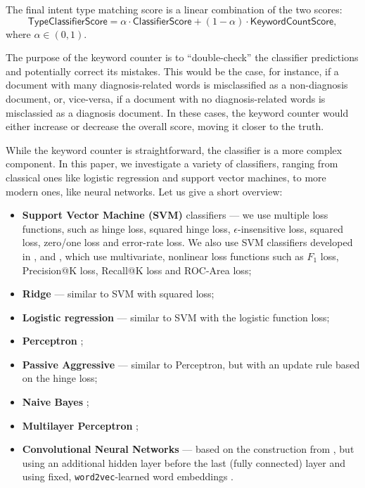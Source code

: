 The final intent type matching score is a linear combination of the two scores:
\begin{equation}\label{clf-combine-formula}
 \textsf{TypeClassifierScore} = \alpha\cdot\textsf{ClassifierScore} + (1-\alpha)\cdot\textsf{KeywordCountScore},
\end{equation}
where $\alpha\in (0,1)$.

The purpose of the keyword counter is to ``double-check'' the classifier predictions and potentially correct its mistakes.
This would be the case, for instance,
if a document with many diagnosis-related words is misclassified as a non-diagnosis document,
or, vice-versa, if a document with no diagnosis-related words is misclassied as a diagnosis document.
In these cases, the keyword counter would either increase or decrease the overall score, moving it closer to the truth.


While the keyword counter is straightforward, the classifier is a more complex component. In this paper, we investigate 
a variety of classifiers, ranging from classical ones like logistic regression and support vector machines, to more modern
ones, like neural networks. Let us give a short overview:

\begin{itemize}
 \item \textbf{Support Vector Machine (SVM)} classifiers ---
we use multiple loss functions, such as hinge loss,
squared hinge loss, $\epsilon$-insensitive loss, squared loss, zero/one loss and error-rate loss. 
We also use SVM classifiers developed in \cite{svmperf3}, \cite{svmperf1} and
\cite{svmperf2}, which use multivariate,
nonlinear loss functions such as $F_1$ loss, Precision@K loss, Recall@K loss and ROC-Area loss;
\item \textbf{Ridge} \cite{scikit} --- similar to SVM with squared loss;
\item \textbf{Logistic regression} \cite{scikit} --- similar to SVM with the logistic function loss;
\item \textbf{Perceptron} \cite{scikit};
\item \textbf{Passive Aggressive} \cite{passiveAggr} --- similar to Perceptron, but with an update rule
  based on the hinge loss;
\item \textbf{Naive Bayes} \cite{ir-intro};
\item \textbf{Multilayer Perceptron} \cite{scikit};
\item \textbf{Convolutional Neural Networks} --- based on the construction from \cite{cnn}, but using an additional
hidden layer before the last (fully connected) layer and using fixed, \texttt{word2vec}-learned word embeddings \cite{w2v}.
\end{itemize}

